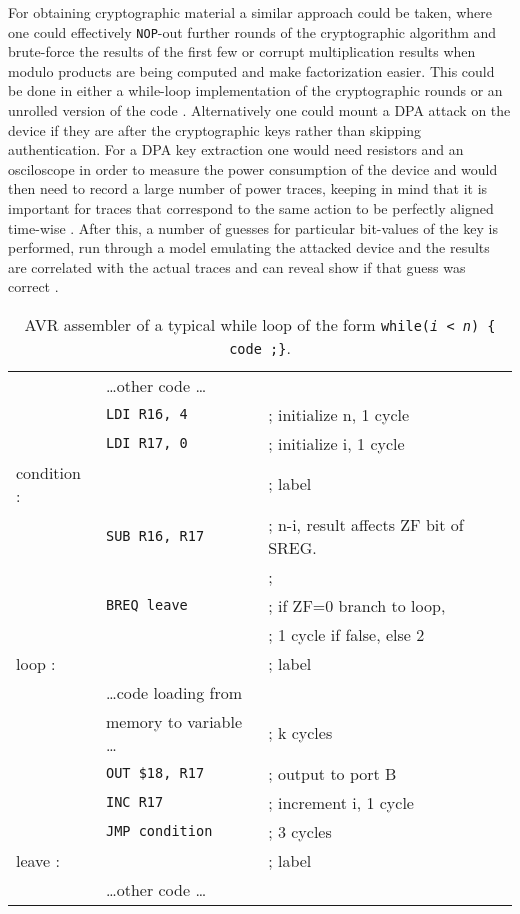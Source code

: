 For obtaining cryptographic material a similar approach could be taken, where one could effectively \texttt{NOP}-out further rounds of the cryptographic algorithm and brute-force the results of the first few \citep{glitches_paper}\citep{sergei:thesis} or corrupt multiplication results when modulo products are being computed and make factorization easier\citep{anderson:cautionary_note}. This could be done in either a while-loop implementation of the cryptographic rounds or an unrolled version of the code \citep{glitches_paper}. Alternatively one could mount a DPA attack on the device if they are after the cryptographic keys rather than skipping authentication. For a DPA key extraction one would need resistors and an osciloscope in order to measure the power consumption of the device \citep{sergei:thesis} \citep{kocher:DPA} \citep{book:power_analysis} and would then need to record a large number of power traces, keeping in mind that it is important for traces that correspond to the same action to be perfectly aligned time-wise \citep{book:power_analysis}. After this, a number of guesses for particular bit-values of the key is performed, run through a model emulating the attacked device and the results are correlated with the actual traces and can reveal show if that guess was correct \citep{book:power_analysis}.

\begin{table}
\caption{\footnotesize AVR assembler of a typical while loop of the form \texttt{while(\emph{i < n}) \{ code ;\}}.}
\label{tab:while}
\center
\begin{tabular}{ l l p{3cm} }
& \dots other code \dots & \\
&\texttt{LDI R16, 4 }& ; initialize n, 1 cycle\\
&\texttt{LDI R17, 0 }& ; initialize i, 1 cycle \\
condition : && ; label\\
& \texttt{SUB R16, R17 }& ; n-i, result affects ZF bit of SREG.\\
& & ; \\
& \texttt{BREQ leave} & ; if ZF=0 branch to loop,\\
& & ; 1 cycle if false, else 2\\
loop : & & ; label\\
& \dots code loading from &\\
& memory to variable \dots & ; k cycles\\
& \texttt{OUT \$18, R17} & ; output to port B\\
& \texttt{INC R17 }& ; increment i, 1 cycle \\
& \texttt{JMP condition }& ; 3 cycles \\
leave : && ; label \\
& \dots other code \dots & \\
\end{tabular}
\end{table}


